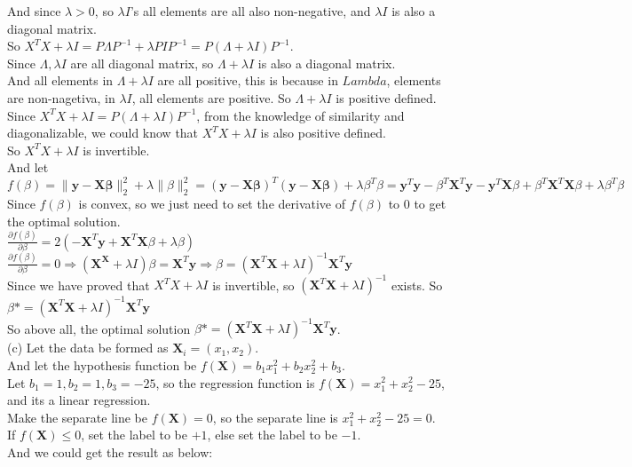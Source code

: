 \documentclass[10pt]{article}
\begin{document}
\begin{enumerate}[1.]
And since $\lambda>0$, so $\lambda I$'s all elements are all also non-negative, and $\lambda I$ is also a diagonal matrix.\\
So $X^TX+\lambda I=P\Lambda P^{-1}+\lambda PIP^{-1}=P(\Lambda+\lambda I)P^{-1}$.\\
Since $\Lambda, \lambda I$ are all diagonal matrix, so $\Lambda+\lambda I$ is also a diagonal matrix.\\
And all elements in $\Lambda+\lambda I$ are all positive, this is because in $Lambda$, elements are non-nagetiva, in $\lambda I$, all elements are positive.
So $\Lambda+\lambda I$ is positive defined.\\
Since $X^TX+\lambda I=P(\Lambda+\lambda I)P^{-1}$,
from the knowledge of similarity and diagonalizable, we could know that $X^TX+\lambda I$ is also positive defined.\\
So $X^TX+\lambda I$ is invertible.\\
And let $f(\beta)=\|\mathbf{y}-\mathbf{X}\mathbf{\beta}\|_2^2 + \lambda\|\beta\|_2^2=(\mathbf{y}-\mathbf{X}\mathbf{\beta})^T(\mathbf{y}-\mathbf{X}\mathbf{\beta})+\lambda\beta^T\beta=\mathbf{y}^T\mathbf{y}-\beta^T\mathbf{X}^T\mathbf{y}-\mathbf{y}^T\mathbf{X}\beta+\beta^T\mathbf{X}^T\mathbf{X}\beta+\lambda\beta^T\beta$\\
Since $f(\beta)$ is convex, so we just need to set the derivative of $f(\beta)$ to 0 to get the optimal solution.\\
$\frac{\partial f(\beta)}{\partial \beta}=2(-\mathbf{X}^T\mathbf{y}+\mathbf{X}^T\mathbf{X}\beta+\lambda\beta)$\\
$\frac{\partial f(\beta)}{\partial \beta}=0\Rightarrow (\mathbf{X}^\mathbf{X}+\lambda I)\beta=\mathbf{X}^T\mathbf{y}\Rightarrow \beta=(\mathbf{X}^T\mathbf{X}+\lambda I)^{-1}\mathbf{X}^T\mathbf{y}$\\

Since we have proved that $X^TX+\lambda I$ is invertible, so $(\mathbf{X}^T\mathbf{X}+\lambda I)^{-1}$ exists.
So $\beta *=(\mathbf{X}^T\mathbf{X}+\lambda I)^{-1}\mathbf{X}^T\mathbf{y}$\\

So above all, the optimal solution $\beta *=(\mathbf{X}^T\mathbf{X}+\lambda I)^{-1}\mathbf{X}^T\mathbf{y}$.\\

(c) Let the data be formed as $\mathbf{X}_i=(x_1,x_2)$.\\
And let the hypothesis function be $f(\mathbf{X})=b_1x_1^2+b_2x_2^2+b_3$.\\
Let $b_1=1,b_2=1,b_3=-25$, so the regression function is $f(\mathbf{X})=x_1^2+x_2^2-25$, and its a linear regression.\\
Make the separate line be $f(\mathbf{X})=0$, so the separate line is $x_1^2+x_2^2-25=0$.\\
If $f(\mathbf{X})\leq 0$, set the label to be $+1$, else set the label to be $-1$.\\
And we could get the result as below:\\


\end{enumerate}
\end{document}
